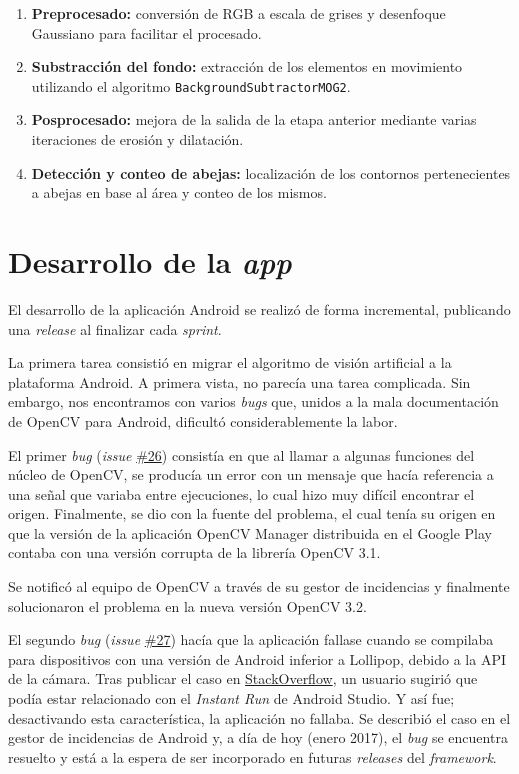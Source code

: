 \begin{enumerate}
\def\labelenumi{\arabic{enumi}.}
\tightlist
\item
  \textbf{Preprocesado:} conversión de RGB a escala de grises y
  desenfoque Gaussiano para facilitar el procesado.
\item
  \textbf{Substracción del fondo:} extracción de los elementos en
  movimiento utilizando el algoritmo \texttt{BackgroundSubtractorMOG2}.
\item
  \textbf{Posprocesado:} mejora de la salida de la etapa anterior
  mediante varias iteraciones de erosión y dilatación.
\item
  \textbf{Detección y conteo de abejas:} localización de los contornos
  pertenecientes a abejas en base al área y conteo de los mismos.
\end{enumerate}

\section{Desarrollo de la \emph{app}}\label{desarrollo-de-la-app}

El desarrollo de la aplicación Android se realizó de forma incremental,
publicando una \emph{release} al finalizar cada \emph{sprint}.

La primera tarea consistió en migrar el algoritmo de visión artificial a
la plataforma Android. A primera vista, no parecía una tarea complicada.
Sin embargo, nos encontramos con varios \emph{bugs} que, unidos a la
mala documentación de OpenCV para Android, dificultó considerablemente
la labor.

El primer \emph{bug} (\emph{issue}
\href{https://github.com/davidmigloz/go-bees/issues/26}{\#26}) consistía
en que al llamar a algunas funciones del núcleo de OpenCV, se producía
un error con un mensaje que hacía referencia a una señal que variaba
entre ejecuciones, lo cual hizo muy difícil encontrar el origen.
Finalmente, se dio con la fuente del problema, el cual tenía su origen
en que la versión de la aplicación OpenCV Manager distribuida en el
Google Play contaba con una versión corrupta de la librería OpenCV 3.1.

Se notificó al equipo de OpenCV a través de su gestor de incidencias y
finalmente solucionaron el problema en la nueva versión OpenCV 3.2.

El segundo \emph{bug} (\emph{issue}
\href{https://github.com/davidmigloz/go-bees/issues/27}{\#27}) hacía que
la aplicación fallase cuando se compilaba para dispositivos con una
versión de Android inferior a Lollipop, debido a la API de la cámara.
Tras publicar el caso en
\href{http://stackoverflow.com/questions/39770355/classnotfoundexception-android-hardware-camera2-cameraaccessexception-with-open}{StackOverflow},
un usuario sugirió que podía estar relacionado con el \emph{Instant Run}
de Android Studio. Y así fue; desactivando esta característica, la
aplicación no fallaba. Se describió el caso en el gestor de incidencias
de Android y, a día de hoy (enero 2017), el \emph{bug} se encuentra
resuelto y está a la espera de ser incorporado en futuras
\emph{releases} del \emph{framework}.

